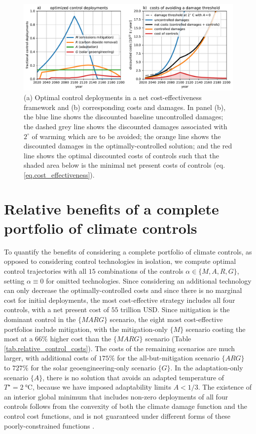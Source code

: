 \documentclass{article}
\begin{document}
\begin{figure}[htb!]
\noindent\includegraphics[width=1.0\textwidth]{figures/default-temp_controls_and_damages.pdf}
\centering
\caption{(a) Optimal control deployments in a net cost-effectiveness framework and (b) corresponding costs and damages. In panel (b), the blue line shows the discounted baseline uncontrolled damages; the dashed grey line shows the discounted damages associated with $2^{\circ}$ of warming which are to be avoided; the orange line shows the discounted damages in the optimally-controlled solution; and the red line shows the optimal discounted costs of controls such that the shaded area below is the minimal net present costs of controls (eq. \ref{eq.cost_effectiveness}).}
\label{fig.approach2}
\end{figure}

\section{Relative benefits of a complete portfolio of climate controls}
To quantify the benefits of considering a complete portfolio of climate controls, as opposed to considering control technologies in isolation, we compute optimal control trajectories with all $15$ combinations of the controls $\alpha \in \{M, A, R, G\}$, setting $\alpha \equiv 0$ for omitted technologies. Since considering an additional technology can only decrease the optimally-controlled costs and since there is no marginal cost for initial deployments, the most cost-effective strategy includes all four controls, with a net present cost of $55$ trillion USD. Since mitigation is the dominant control in the $\{MARG\}$ scenario, the eight most cost-effective portfolios include mitigation, with the mitigation-only $\{M\}$ scenario costing the most at a $66\%$ higher cost than the $\{MARG\}$ scenario (Table \ref{tab.relative_control_costs}). The costs of the remaining scenarios are much larger, with additional costs of $175\%$ for the all-but-mitigation scenario $\{ARG\}$ to $727\%$ for the solar geoengineering-only scenario $\{G\}$. In the adaptation-only scenario $\{A\}$, there is no solution that avoids an adapted temperature of $T^{\star} = \SI{2}{\celsius}$, because we have imposed adaptability limits $A < 1/3$. The existence of an interior global minimum that includes non-zero deployments of all four controls follows from the convexity of both the climate damage function and the control cost functions, and is not guaranteed under different forms of these poorly-constrained functions \citep[e.g.][]{lempert_multiple_2006}.
\end{document}
